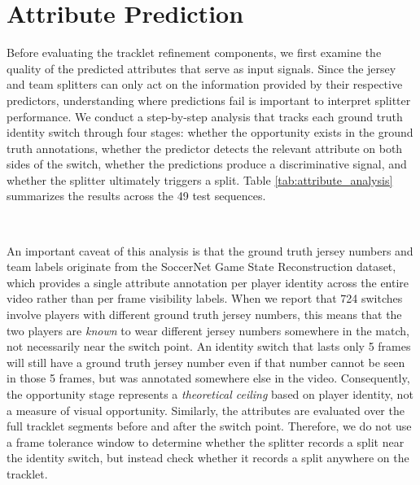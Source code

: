 \section{Attribute Prediction}\label{sec:attribute_prediction}
Before evaluating the tracklet refinement components, we first examine the quality of the predicted attributes that serve as input signals. Since the jersey and team splitters can only act on the information provided by their respective predictors, understanding where predictions fail is important to interpret splitter performance. We conduct a step-by-step analysis that tracks each ground truth identity switch through four stages: whether the opportunity exists in the ground truth annotations, whether the predictor detects the relevant attribute on both sides of the switch, whether the predictions produce a discriminative signal, and whether the splitter ultimately triggers a split. Table \ref{tab:attribute_analysis} summarizes the results across the 49 test sequences.

\

An important caveat of this analysis is that the ground truth jersey numbers and team labels originate from the SoccerNet Game State Reconstruction dataset, which provides a single attribute annotation per player identity across the entire video rather than per frame visibility labels. When we report that 724 switches involve players with different ground truth jersey numbers, this means that the two players are \emph{known} to wear different jersey numbers somewhere in the match, not necessarily near the switch point. An identity switch that lasts only 5 frames will still have a ground truth jersey number even if that number cannot be seen in those 5 frames, but was annotated somewhere else in the video. Consequently, the opportunity stage represents a \emph{theoretical ceiling} based on player identity, not a measure of visual opportunity. Similarly, the attributes are evaluated over the full tracklet segments before and after the switch point. Therefore, we do not use a frame tolerance window to determine whether the splitter records a split near the identity switch, but instead check whether it records a split anywhere on the tracklet.


